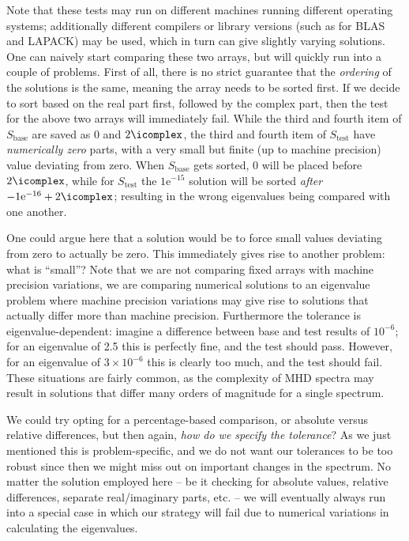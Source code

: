 Note that these tests may run on different machines running different operating systems; additionally different compilers or library versions (such as for BLAS and LAPACK) may be used, which in turn can give slightly varying solutions. One can naively start comparing these two arrays, but will quickly run into a couple of problems. First of all, there is no strict guarantee that the \emph{ordering} of the solutions is the same, meaning the array needs to be sorted first. If we decide to sort based on the real part first, followed by the complex part, then the test for the above two arrays will immediately fail. While the third and fourth item of $S_\text{base}$ are saved as 0 and $2\icomplex$, the third and fourth item of $S_\text{test}$ have \emph{numerically zero} parts, with a very small but finite (up to machine precision) value deviating from zero. When $S_\text{base}$ gets sorted, 0 will be placed before $2\icomplex$, while for $S_\text{test}$ the $1\text{e}^{-15}$ solution will be sorted \emph{after} $-1\text{e}^{-16} + 2\icomplex$; resulting in the wrong eigenvalues being compared with one another.

One could argue here that a solution would be to force small values deviating from zero to actually be zero. This immediately gives rise to another problem: what is ``small''? Note that we are not comparing fixed arrays with machine precision variations, we are comparing numerical solutions to an eigenvalue problem where machine precision variations may give rise to solutions that actually differ more than machine precision. Furthermore the tolerance is eigenvalue-dependent: imagine a difference between base and test results of $10^{-6}$; for an eigenvalue of 2.5 this is perfectly fine, and the test should pass. However, for an eigenvalue of $3 \times 10^{-6}$ this is clearly too much, and the test should fail. These situations are fairly common, as the complexity of MHD spectra may result in solutions that differ many orders of magnitude for a single spectrum.

We could try opting for a percentage-based comparison, or absolute versus relative differences, but then again, \emph{how do we specify the tolerance}? As we just mentioned this is problem-specific, and we do not want our tolerances to be too robust since then we might miss out on important changes in the spectrum. No matter the solution employed here -- be it checking for absolute values, relative differences, separate real/imaginary parts, etc. -- we will eventually always run into a special case in which our strategy will fail due to numerical variations in calculating the eigenvalues.

